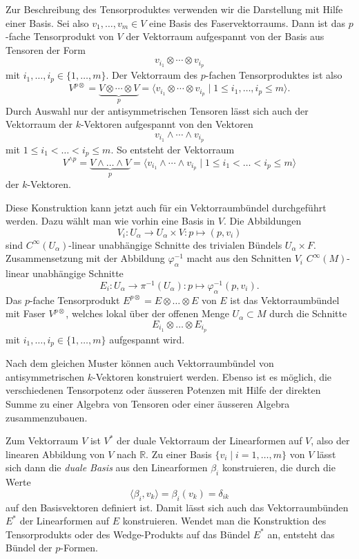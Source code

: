 Zur Beschreibung des Tensorproduktes verwenden wir die Darstellung
mit Hilfe einer Basis.
Sei also $v_1,\dots,v_m\in V$ eine Basis des Faservektorraums.
Dann ist das $p$-fache Tensorprodukt von $V$ der Vektorraum aufgespannt
von der Basis aus Tensoren der Form
\[
v_{i_1}\otimes \cdots\otimes v_{i_p}
\]
mit $i_1,\dots,i_p\in \{1,\dots,m\}$.
Der Vektorraum des $p$-fachen Tensorproduktes ist also
\[
V^{p\otimes}
=
\underbrace{ V\otimes\cdots\otimes V }_{\displaystyle p}
=
\langle
v_{i_1}\otimes\cdots\otimes v_{i_p}
\mid
1\le
i_1,\dots,i_p 
\le m
\rangle.
\]
Durch Auswahl nur der antisymmetrischen Tensoren lässt sich auch
der Vektorraum der $k$-Vektoren aufgespannt von den Vektoren
\[
v_{i_1}\wedge\cdots\wedge v_{i_p}
\]
mit $1\le i_1 < \dots < i_p\le m$.
So entsteht der Vektorraum 
\[
V^{\wedge p}
=
\underbrace{V\wedge\dots\wedge V}_{\displaystyle p}
=
\langle
v_{i_1}\wedge\cdots\wedge v_{i_p}
\mid
1\le i_1 < \dots < i_p\le m
\rangle
\]
der $k$-Vektoren.

Diese Konstruktion kann jetzt auch für ein Vektorraumbündel
durchgeführt werden.
Dazu wählt man wie vorhin eine Basis in $V$. 
Die Abbildungen
\[
V_i
\colon
U_\alpha \to U_\alpha\times V
:
p\mapsto (p,v_i)
\]
sind $C^\infty(U_\alpha)$-linear unabhängige Schnitte des trivialen
Bündels $U_\alpha\times F$.
Zusammensetzung mit der Abbildung $\varphi_\alpha^{-1}$ macht aus den
Schnitten $V_i$ $C^\infty(M)$-linear unabhängige Schnitte
\[
E_i
\colon
U_\alpha \to \pi^{-1}(U_\alpha)
:
p \mapsto \varphi_\alpha^{-1}(p,v_i).
\]
Das $p$-fache Tensorprodukt $E^{p\otimes}=E\otimes\dots\otimes E$ von $E$ 
ist das Vektorraumbündel mit Faser $V^{p\otimes}$, welches lokal über der
offenen Menge $U_\alpha\subset M$ durch die Schnitte 
\[
E_{i_1}\otimes \dots \otimes E_{i_p}
\]
mit
$i_1,\dots,i_p\in\{1,\dots,m\}$
aufgespannt wird.

Nach dem gleichen Muster können auch Vektorraumbündel von
antisymmetrischen $k$-Vektoren konstruiert werden.
Ebenso ist es möglich, die verschiedenen Tensorpotenz oder
äusseren Potenzen mit Hilfe der direkten Summe zu einer Algebra
von Tensoren oder einer äusseren Algebra zusammenzubauen.

Zum Vektorraum $V$ ist $V^*$ der duale Vektorraum der Linearformen
auf $V$, also der linearen Abbildung von $V$ nach $\mathbb{R}$.
Zu einer Basis $\{v_i\mid i=1,\dots,m\}$ von $V$ lässt sich dann
die {\em duale Basis} aus den Linearformen $\beta_i$ konstruieren, die
%
durch die Werte
\[
\langle \beta_i,v_k\rangle
=
\beta_i (v_k)
=
\delta_{ik}
\]
auf den Basisvektoren definiert ist.
Damit lässt sich auch das Vektorraumbünden $E^*$ der Linearformen
auf $E$ konstruieren.
Wendet man die Konstruktion des Tensorprodukts oder des Wedge-Produkts
auf das Bündel $E^*$ an, entsteht das Bündel der 
$p$-Formen.

